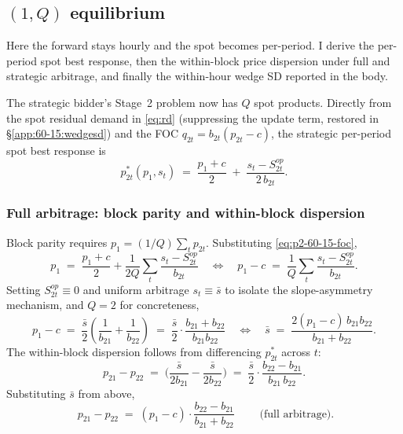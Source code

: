 \documentclass[11pt,a4paper]{article}
\theoremstyle{definition}
\theoremstyle{remark}
\theoremstyle{plain}
\begin{document}
\subsection{$(1,Q)$ equilibrium}\label{app:state-60-15}

Here the forward stays hourly and the spot becomes per-period. I derive the per-period spot best response, then the within-block price dispersion under full and strategic arbitrage, and finally the within-hour wedge SD reported in the body.

The strategic bidder's Stage~2 problem now has $Q$ spot products. Directly from the spot residual demand in \eqref{eq:rd} (suppressing the update term, restored in \S\ref{app:60-15:wedgesd}) and the FOC $q_{2t} = b_{2t}(p_{2t}-c)$, the strategic per-period spot best response is
\begin{equation}
p_{2t}^*(p_1, s_t) \;=\; \frac{p_1 + c}{2} \;+\; \frac{s_t - S^{op}_{2t}}{2\, b_{2t}}.
\label{eq:p2-60-15-foc}
\end{equation}

\subsubsection{Full arbitrage: block parity and within-block dispersion}\label{app:60-15:full}
Block parity requires $p_1 = (1/Q) \sum_t p_{2t}$. Substituting \eqref{eq:p2-60-15-foc},
\[
p_1 \;=\; \frac{p_1 + c}{2} + \frac{1}{2 Q}\!\sum_t\!\frac{s_t - S^{op}_{2t}}{b_{2t}}
\quad\Longleftrightarrow\quad
p_1 - c \;=\; \frac{1}{Q}\!\sum_t\!\frac{s_t - S^{op}_{2t}}{b_{2t}}.
\]
Setting $S^{op}_{2t} \equiv 0$ and uniform arbitrage $s_t \equiv \bar s$ to isolate the slope-asymmetry mechanism, and $Q = 2$ for concreteness,
\[
p_1 - c \;=\; \frac{\bar s}{2}\!\left(\frac{1}{b_{21}} + \frac{1}{b_{22}}\right) \;=\; \frac{\bar s}{2}\cdot\frac{b_{21}+b_{22}}{b_{21} b_{22}}
\quad\Longleftrightarrow\quad
\bar s \;=\; \frac{2(p_1 - c)\, b_{21} b_{22}}{b_{21} + b_{22}}.
\]
The within-block dispersion follows from differencing $p_{2t}^*$ across $t$:
\[
p_{21} - p_{22} \;=\; \bigg(\frac{\bar s}{2 b_{21}} - \frac{\bar s}{2 b_{22}}\bigg) \;=\; \frac{\bar s}{2}\cdot\frac{b_{22} - b_{21}}{b_{21}\, b_{22}}.
\]
Substituting $\bar s$ from above,
\begin{equation}
\boxed{\;p_{21} - p_{22} \;=\; (p_1 - c)\cdot \frac{b_{22} - b_{21}}{b_{21} + b_{22}}\;}\qquad\text{(full arbitrage)}.
\label{eq:within-block-full}
\end{equation}
\end{document}
